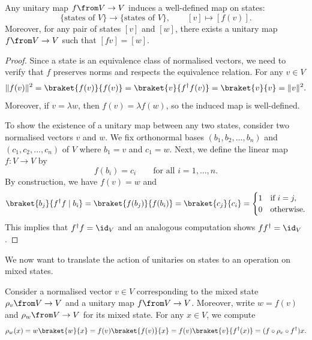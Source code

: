 \documentclass[a4paper,oneside, 12pt]{amsart}
\begin{document}
\begin{lemma}\label{lem:induced-map-on-states}
  Any unitary map \( f \from V \to V \) induces a well-defined map on states:
  \begin{equation}
    \{\text{states of } V\} \to \{\text{states of } V\}, \qquad [v] \mapsto [f(v)].
  \end{equation}
  Moreover, for any pair of states \( [v] \) and \( [w] \), there exists a unitary map \( f \from V\to V\) such that \( [fv] = [w] \).
\end{lemma}
\begin{proof}
  Since a state is an equivalence class of normalised vectors, we need to verify that \( f \) preserves norms and respects the equivalence relation.
  For any \( v \in V \)
  \begin{equation*}
    \|f(v)\|^2
    = \braket{f(v)}{f(v)}
    = \braket{v}{f^\dagger f(v)}
    = \braket{v}{v}
    = \|v\|^2.
  \end{equation*}
  Moreover, if \( v = \lambda w \), then \( f(v) = \lambda f(w) \), so the induced map is well-defined.

  To show the existence of a unitary map between any two states, consider two normalised vectors \( v \) and \( w \).
  We fix  orthonormal bases \( (b_1, b_2, \dots, b_n) \) and \((c_1, c_2, \dots, c_n)\) of \(V\) where \(b_{1} = v\) and \(c_{1} =  w\).
  Next, we define the linear map \( f \colon V \to V \) by
  \begin{equation*}
        f (b_i) = c_i \qquad  \text{for all } i = 1, \dots, n.
  \end{equation*}
 By construction, we have \(f(v) = w\) and
 \begin{equation*}
   \braket{b_{j}}{f^{\dagger}f\mid b_{i}} = \braket{f(b_{j})}{f(b_{i})} = \braket{c_{j}}{c_{i}} =
   \begin{cases}
     1 & \text{if } i = j, \\
     0 & \text{otherwise.}
   \end{cases}
 \end{equation*}
 This implies that \(f^{\dagger}f = \id_{V}\) and an analogous computation shows \(ff^{\dagger}=\id_{V}\).
\end{proof}

We now want to translate the action of unitaries on states to an operation on mixed states.

\begin{remark}\label{rmk:unitaries-on-mixed-states}
  Consider a normalised vector \(v \in V \) corresponding to the mixed state \(\rho_{v}\from V\to V\) and a unitary map \( f \from V \to V \).
  Moreover, write \(w = f(v)\) and \(\rho_{w}\from V\to V\) for its mixed state.
  For any \(x\in V\), we compute
  \begin{equation*}
    \rho_{w}(x)
    = w \braket{w}{x}
    = f(v) \braket{f(v)}{x}
    = f(v)\braket{v}{f^{\dagger}(x)}
    = (f \circ \rho_{v} \circ f^{\dagger}) x.
  \end{equation*}
\end{remark}
\end{document}
